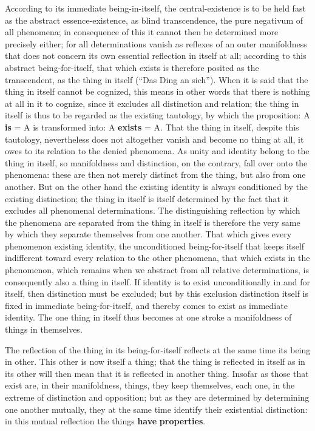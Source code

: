 \documentclass[12pt,a4paper,openany]{book}
\newcommand{\opage}[1]{\marginnote{\footnotesize\textit{[#1]}}}
\begin{document}
According to its immediate being-in-itself, the central-existence
is to be held fast as the abstract essence-existence,
as blind transcendence, the pure negativum of
all phenomena; in consequence of this it cannot then
be determined more precisely either; for all determinations vanish
as reflexes of an outer manifoldness that does not
concern its own essential reflection in itself at all;
according to this abstract being-for-itself, that which exists
is therefore posited as the transcendent, as the thing in itself
(``Das Ding an sich''). When it is said that the thing
\setcounter{footnote}{0}%
\opage{171}in itself cannot be cognized, this means in other words
that there is nothing at all in it to cognize, since
it excludes all distinction and relation; the thing in itself
is thus to be regarded as the existing tautology,
by which the proposition: A \textbf{is} = A is transformed into:
A \textbf{exists} = A. That the thing in itself, despite this
tautology, nevertheless does not altogether vanish and become
no thing at all, it owes to its relation to the denied
phenomena. As unity and identity belong
to the thing in itself, so manifoldness
and distinction, on the contrary, fall over onto the phenomena: these are
then not merely distinct from the thing, but also from one another.
But on the other hand the
existing identity is always conditioned by the existing
distinction; the thing in itself is itself determined by the fact that it
excludes all phenomenal determinations. The distinguishing
reflection by which the phenomena are separated from
the thing in itself is therefore the very same by which they separate
themselves from one another. That which gives every phenomenon
existing identity, the unconditioned being-for-itself
that keeps itself indifferent toward every relation
to the other phenomena, that which exists in the phenomenon,
which remains when we abstract from all
relative determinations, is consequently also a thing in itself.
If identity is to exist unconditionally in and for itself, then
distinction must be excluded; but by this exclusion
distinction itself is fixed in immediate being-for-itself,
and thereby comes to exist as immediate identity.
The one thing in itself thus becomes at one
stroke a manifoldness of things in themselves.

The reflection of the thing in its being-for-itself reflects
at the same time its being in other. This other is now itself
a thing; that the thing is reflected in itself as in its other
will then mean that it is reflected in another thing.
\setcounter{footnote}{0}%
\opage{172}Insofar as those that exist are, in their manifoldness, things,
they keep themselves, each one, in the extreme of distinction and opposition;
but as they are determined by determining
one another mutually, they at the same time identify their existential distinction: in this mutual reflection the things \textbf{have}
\textbf{properties}.
\end{document}
